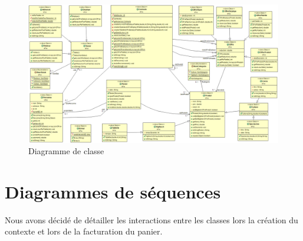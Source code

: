\documentclass{article}
\begin{document}
\begin{figure}
	\vfill\hfill %
	\includegraphics[scale=0.36]{diagUML.png}
	\hfill\vfill %
	\caption{Diagramme de classe}
\end{figure}

\clearpage %

\section*{Diagrammes de séquences}

Nous avons décidé de détailler les interactions entre les classes lors la création du contexte et lors de la facturation du panier.
\end{document}
